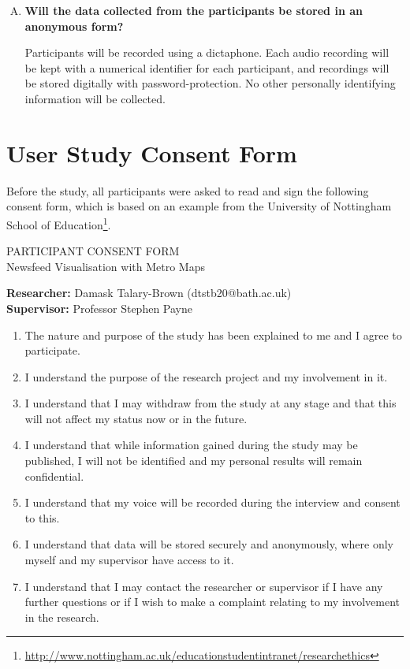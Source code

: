 \begin{enumerate}[Q.1]
	\item\textbf{Will the data collected from the participants be stored in an anonymous form?} \par
	Participants will be recorded using a dictaphone. Each audio recording will be kept with a numerical identifier for each participant, and recordings will be stored digitally with password-protection. No other personally identifying information will be collected.
\end{enumerate}

\section{User Study Consent Form}
\label{sec:consent}

Before the study, all participants were asked to read and sign the following consent form, which is based on an example from the University of Nottingham School of Education\footnote{\url{http://www.nottingham.ac.uk/educationstudentintranet/researchethics}}. \\[0.5cm]

\begin{center} PARTICIPANT CONSENT FORM \\[0.3cm] Newsfeed Visualisation with Metro Maps \end{center}

\textbf{Researcher:} Damask Talary-Brown (dtstb20@bath.ac.uk) \\
\textbf{Supervisor:} Professor Stephen Payne

\begin{enumerate}[1)]
\item The nature and purpose of the study has been explained to me and I agree to participate.

\item I understand the purpose of the research project and my involvement in it.

\item I understand that I may withdraw from the study at any stage and that this will not affect my status now or in the future.

\item I understand that while information gained during the study may be published, I will not be identified and my personal results will remain confidential.

\item I understand that my voice will be recorded during the interview and consent to this.

\item I understand that data will be stored securely and anonymously, where only myself and my supervisor have access to it.

\item I understand that I may contact the researcher or supervisor if I have any further questions or if I wish to make a complaint relating to my involvement in the research.\\[1cm]
\end{enumerate}

